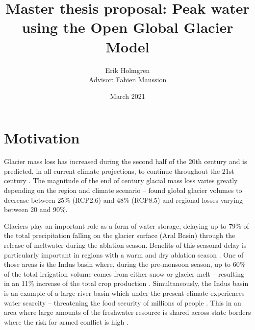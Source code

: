 \documentclass[12pt, a4paper]{article}
\author{Erik Holmgren \\ Advisor: Fabien Maussion}
\title{Master thesis proposal: Peak water using the Open Global Glacier Model}
\date{March 2021}
\begin{document}
\maketitle
\noindent
\section{Motivation}
Glacier mass loss has increased during the second half of the 20th century
\parencite{vaughanObservationsCryosphere2013} and is predicted, in all current
climate projections, to continue throughout the 21st century
\parencite{ipccClimateChange20142014}. The magnitude of the end of century
glacial mass loss varies greatly depending on the region and climate scenario --
\textcite{hussNewModelGlobal2015} found global glacier volumes to decrease
between 25\% (RCP2.6) and 48\% (RCP8.5) and regional losses varying between 20
and 90\%.



Glaciers play an important role as a form of water storage, delaying up to 79\%
of the total precipitation falling on the glacier surface (Aral Basin) through
the release of meltwater during the ablation season. Benefits of this seasonal
delay is particularly important in regions with a warm and dry ablation season
\parencite{kaserContributionPotentialGlaciers2010}. One of those areas is the
Indus basin where, during the pre-monsoon season, up to 60\% of the total
irrigation volume comes from either snow or glacier melt -- resulting in an 11\%
increase of the total crop production
\parencite{biemansImportanceSnowGlacier2019}. Simultaneously, the Indus basin is
an example of a large river basin which under the present climate experiences
water scarcity -- threatening the food security of millions of people
\parencite{kummuClimatedrivenInterannualVariability2014}. This in an area where
large amounts of the freshwater resource is shared across state borders where
the risk for armed conflict is high
\parencite{schleussnerArmedconflictRisksEnhanced2016,
pritchardAsiaShrinkingGlaciers2019}. 
\end{document}
